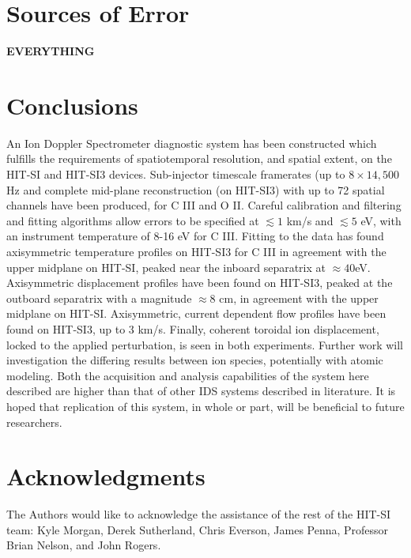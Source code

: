 \documentclass{AIAA}
\begin{document}
\section{Sources of Error}
\hspace*{4ex} \textbf{EVERYTHING}
\section{Conclusions}
\hspace{4ex}An Ion Doppler Spectrometer diagnostic system has been constructed which fulfills the requirements of spatiotemporal resolution, and spatial extent, on the HIT-SI and HIT-SI3 devices. Sub-injector timescale framerates (up to $8\times{14,500}$Hz and complete mid-plane reconstruction (on HIT-SI3) with up to 72 spatial channels have been produced, for C III and O II. Careful calibration and filtering and fitting algorithms allow errors to be specified at $\lesssim1$ km/s and $\lesssim5$ eV, with an instrument temperature of 8-16 eV for C III. Fitting to the data has found axisymmetric temperature profiles on HIT-SI3 for C III in agreement with the upper midplane on HIT-SI, peaked near the inboard separatrix at $\approx40$eV. Axisymmetric displacement profiles have been found on HIT-SI3, peaked at the outboard separatrix with a magnitude $\approx8$ cm, in agreement with the upper midplane on HIT-SI. Axisymmetric, current dependent flow profiles have been found on HIT-SI3, up to 3 km/s. Finally, coherent toroidal ion displacement, locked to the applied perturbation, is seen in both experiments. Further work will investigation the differing results between ion species, potentially with atomic modeling. Both the acquisition and analysis capabilities of the system here described are higher than that of other IDS systems described in literature. It is hoped that replication of this system, in whole or part, will be beneficial to future researchers.


\section{Acknowledgments}
The Authors would like to acknowledge the assistance of the rest of the HIT-SI team: Kyle Morgan, Derek Sutherland, Chris Everson, James Penna, Professor Brian Nelson, and John Rogers.
\end{document}
